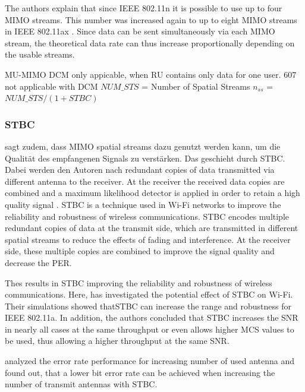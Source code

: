The authors explain that since IEEE 802.11n it is possible to use up to four MIMO streams. This number was increased again to up to eight MIMO streams in IEEE 802.11ax \cite{noauthor_ieee_2021}. Since data can be sent simultaneously via each MIMO stream, the theoretical data rate can thus increase proportionally depending on the usable streams.

MU-\ac{MIMO} DCM only appicable, when RU contains only data for one user.
\cite{noauthor_ieee_2021} 607 not applicable with DCM
$NUM\_STS$ = Number of Spatial Streams
$n_{ss}$ = $NUM\_STS / (1 + STBC)$
\subsubsection*{\acf{STBC}}
\textcite{abbas_efficient_2016} sagt zudem, dass \ac{MIMO} spatial streams dazu genutzt werden kann, um die Qualität des empfangenen Signals zu verstärken.
Das geschieht durch \ac{STBC}. Dabei werden den Autoren nach redundant copies of data transmitted via different antenna to the receiver. At the receiver the received data copies are combined and a maximum likelihood detector is applied in order to retain a high quality signal \cite{santumon_space-time_2012}.
\ac{STBC} is a technique used in Wi-Fi networks to improve the reliability and robustness of wireless communications.
\ac{STBC} encodes multiple redundant copies of data at the transmit side, which are transmitted in different spatial streams to
reduce the effects of fading and interference. At the receiver side, these multiple copies are combined to improve the
signal quality and decrease the \ac{PER}.

Thes results  in \ac{STBC} improving the reliability and robustness of wireless communications.
Here, \textcite{stamoulis_impact_2003} has investigated the potential effect of \ac{STBC} on Wi-Fi. Their simulations showed that\ac{STBC} can increase the range and robustness for IEEE 802.11a.
In addition, the authors concluded  that \ac{STBC} increases the \ac{SNR} in nearly all cases at the same throughput or even allows higher \ac{MCS} values to be used,
thus allowing a higher throughput at the same \ac{SNR}.

\textcite{ghosh_error_2014} analyzed the error rate performance for increasing number of used antenna and found out, that a lower bit error rate can be achieved
when increasing the number of transmit antennas with \ac{STBC}.

